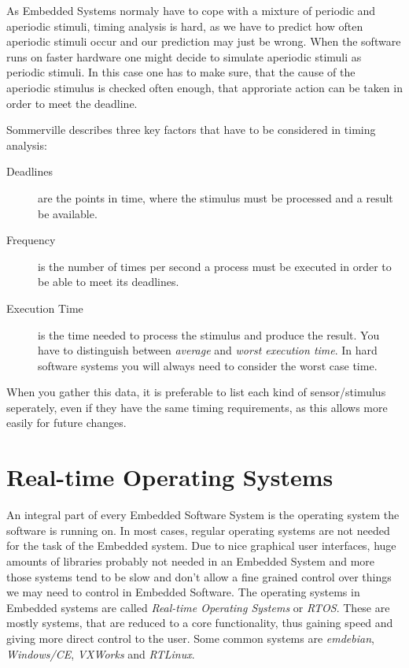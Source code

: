 \documentclass[10pt,a4paper,titlepage,draft]{article} %
\begin{document}
As Embedded Systems normaly have to cope with a mixture of periodic and aperiodic stimuli, timing analysis is hard, as we have to predict how often aperiodic stimuli occur and our prediction may just be wrong.
When the software runs on faster hardware one might decide to simulate aperiodic stimuli as periodic stimuli.
In this case one has to make sure, that the cause of the aperiodic stimulus is checked often enough, that approriate action can be taken in order to meet the deadline.

Sommerville describes three key factors that have to be considered in timing analysis:
\begin{description}
	\item[Deadlines] are the points in time, where the stimulus must be processed and a result be available.
	\item[Frequency] is the number of times per second a process must be executed in order to be able to meet its deadlines.
	\item[Execution Time] is the time needed to process the stimulus and produce the result.
	You have to distinguish between \emph{average} and \emph{worst execution time}.
	In hard software systems you will always need to consider the worst case time.
\end{description}
When you gather this data, it is preferable to list each kind of sensor/stimulus seperately, even if they have the same timing requirements, as this allows more easily for future changes.

\section{Real-time Operating Systems}
An integral part of every Embedded Software System is the operating system the software is running on.
In most cases, regular operating systems are not needed for the task of the Embedded system.
Due to nice graphical user interfaces, huge amounts of libraries probably not needed in an Embedded System and more those systems tend to be slow and don't allow a fine grained control over things we may need to control in Embedded Software.
The operating systems in Embedded systems are called \emph{Real-time Operating Systems} or \emph{RTOS}.
These are mostly systems, that are reduced to a core functionality, thus gaining speed and giving more direct control to the user.
Some common systems are \emph{emdebian}, \emph{Windows/CE}, \emph{VXWorks} and \emph{RTLinux}.
\end{document}
